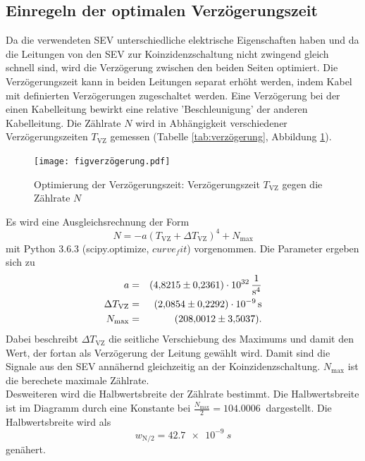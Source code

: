 \subsection{Einregeln der optimalen Verzögerungszeit}
Da die verwendeten SEV unterschiedliche elektrische Eigenschaften haben und da die Leitungen von den SEV zur Koinzidenzschaltung nicht zwingend gleich schnell sind, wird die Verzögerung zwischen den beiden Seiten optimiert.
Die Verzögerungszeit kann in beiden Leitungen separat erhöht werden, indem Kabel mit definierten Verzögerungen zugeschaltet werden.
Eine Verzögerung bei der einen Kabelleitung bewirkt eine relative 'Beschleunigung' der anderen Kabelleitung.
Die Zählrate $N$ wird in Abhängigkeit verschiedener Verzögerungszeiten $T_{\text{VZ}}$ gemessen (Tabelle \ref{tab:verzögerung}, Abbildung \ref{fig:verzögerung}).

\begin{figure}[h!]
  \centering
  \texttt{[image: figverzögerung.pdf]}
  \caption{Optimierung der Verzögerungszeit: Verzögerungszeit $T_{\text{VZ}}$ gegen die Zählrate $N$}
  \label{fig:verzögerung}
\end{figure}
Es wird eine Ausgleichsrechnung der Form
\begin{equation*}
  N = -a \left( T_{\text{VZ}} + \Delta T_{\text{VZ}} \right)^4+N_{\text{max}}
\end{equation*}
mit Python 3.6.3 (scipy.optimize, $curve_fit$) vorgenommen.
Die Parameter ergeben sich zu
\begin{align*}
  a                     &=& \SI{  4.8215 \pm 0.2361 e32}{\frac{1}{s^4}}\\
  \Delta T_{\text{VZ}}  &=& \SI{  2.0854 \pm 0.2292 e-9}{s}\\
  N_{\text{max}}        &=& \SI{208.0012 \pm 3.5037 }{}.\\
\end{align*}
Dabei beschreibt $\Delta T_{\text{VZ}}$ die seitliche Verschiebung des Maximums und damit den Wert, der fortan als Verzögerung der Leitung gewählt wird.
Damit sind die Signale aus den SEV annähernd gleichzeitig an der Koinzidenzschaltung. $N_{\text{max}}$ ist die berechete maximale Zählrate.\\
Desweiteren wird die Halbwertsbreite der Zählrate bestimmt.
Die Halbwertsbreite ist im Diagramm durch eine Konstante bei $\frac{N_{\text{max}}}{2}=\SI{104.0006}{}$ dargestellt.
Die Halbwertsbreite wird als
\begin{equation*}
  w_{\text{N/2}}= \SI{42.7e-9}{s}
\end{equation*}
genähert.
\FloatBarrier
